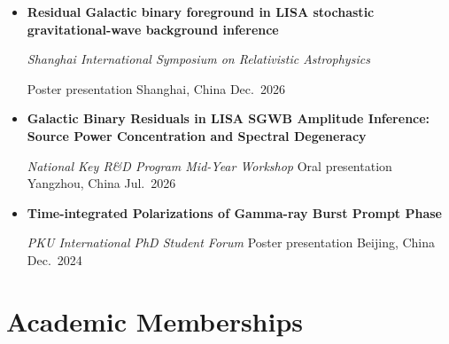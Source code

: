 \documentclass[letterpaper,11pt]{article}
\begin{document}
\begin{itemize}[
    leftmargin=0.15in,
    label={},
    topsep=2pt,
    itemsep=8pt,
    parsep=0pt
]


    \item
    \textbf{Residual Galactic binary foreground
    in LISA stochastic gravitational-wave
    background inference}
    \par\vspace{1pt}

    {\small
        \textit{Shanghai International Symposium
        on Relativistic Astrophysics}
        \par

        Poster presentation
        \hfill
        Shanghai, China
        \quad Dec.\ 2026
        \par
    }


    \item
    \textbf{Galactic Binary Residuals in LISA
    SGWB Amplitude Inference:
    Source Power Concentration and
    Spectral Degeneracy}
    \par\vspace{1pt}

    {\small
        \textit{National Key R\&D Program
        Mid-Year Workshop}
        \enspace\textbar\enspace
        Oral presentation
        \hfill
        Yangzhou, China
        \quad Jul.\ 2026
        \par
    }


    \item
    \textbf{Time-integrated Polarizations
    of Gamma-ray Burst Prompt Phase}
    \par\vspace{1pt}

    {\small
        \textit{PKU International PhD Student Forum}
        \enspace\textbar\enspace
        Poster presentation
        \hfill
        Beijing, China
        \quad Dec.\ 2024
        \par
    }

\end{itemize}


\section{Academic Memberships}
\end{document}
